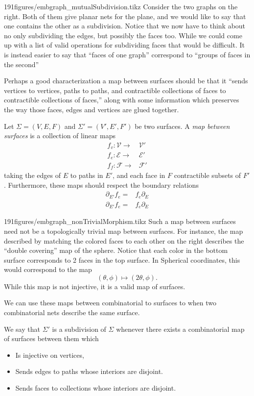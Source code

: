 \begin{examplefigureenv}{191figures/embgraph_mutualSubdivision.tikz}
	Consider the two graphs on the right. Both of them give planar nets for the plane, and we would like to say that one contains the other as a subdivision. Notice that we now have to think about no only subdividing the edges, but possibly the faces too. While we could come up with a list of valid operations for subdividing faces that would be difficult. It is instead easier to say that ``faces of one graph'' correspond to ``groups of faces in the second''
\end{examplefigureenv}
Perhaps a good characterization a map between surfaces should be that it ``sends vertices to vertices, paths to paths, and contractible collections of faces to contractible collections of faces,'' along with some information which preserves the way those faces, edges and vertices are glued together. 
\begin{definition}
Let $\Sigma= (V, E, F)$ and $\Sigma'=(V', E', F')$ be two surfaces. A \emph{map between surfaces} is a collection of linear maps
\begin{align*}
f_v:\mathcal V\to &\mathcal V'\\
f_e:\mathcal E\to &\mathcal E'\\
f_f:\mathcal F\to &\mathcal F'
\end{align*}
taking the edges of $E$ to paths in $E'$, and each face in $F$ contractible subsets of $F'$. Furthermore, these maps should respect the boundary relations 
\begin{align*}
\partial_{E'} f_e = &f_e \partial_{E}\\
\partial_{E'} f_e = &f_e \partial_{E}
\end{align*}
\end{definition}


\begin{examplefigureenv}{191figures/embgraph_nonTrivialMorphism.tikz}
	Such a map between surfaces need not be a topologically trivial map between surfaces. For instance, the map described by matching the colored faces to each other on the right describes the ``double covering'' map of the sphere. Notice that each color in the bottom surface corresponds to 2 faces in the top surface. In Spherical coordinates, this would correspond to the map 
\[(\theta, \phi)\mapsto (2\theta, \phi).\]
While this map is not injective, it is a valid map of surfaces. 
\end{examplefigureenv}
We can use these maps between combinatorial to surfaces to when two combinatorial nets describe the same surface. 
\begin{definition}
We say that $\Sigma'$ is a subdivision of $\Sigma$ whenever there exists a combinatorial map of surfaces between them which 
\begin{itemize}
\item Is injective on vertices, 
\item Sends edges to paths whose interiors are disjoint.
\item Sends faces to collections whose interiors are disjoint. 
\end{itemize}
\end{definition}

